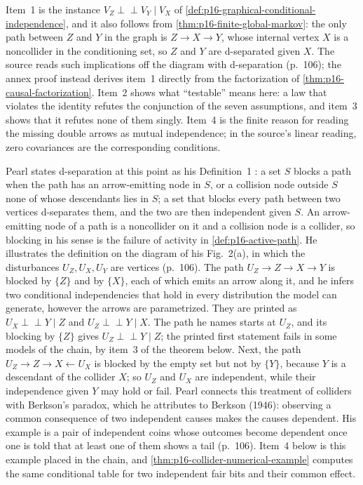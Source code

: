 Item~1 is the instance \(V_Z\mathrel{\perp\!\!\!\perp}V_Y\mid V_X\) of
\cref{def:p16-graphical-conditional-independence}, and it also follows
from \cref{thm:p16-finite-global-markov}: the only path between \(Z\)
and \(Y\) in the graph is \(Z\to X\to Y\), whose internal vertex \(X\)
is a noncollider in the conditioning set, so \(Z\) and \(Y\) are
d-separated given \(X\). The source reads such implications off the
diagram with d-separation (p.~106); the annex proof instead derives
item~1 directly from the factorization of
\cref{thm:p16-causal-factorization}. Item~2 shows what ``testable''
means here: a law that violates the identity refutes the conjunction of
the seven assumptions, and item~3 shows that it refutes none of them
singly. Item~4 is the finite reason for reading the missing double arrows
as mutual independence; in the source's linear reading, zero covariances
are the corresponding conditions.

Pearl states d-separation at this point as his Definition~1
\cite[sec.~3.1, p.~106]{Pearl2009CausalOverview}: a set \(S\) blocks a
path when the path has an arrow-emitting node in \(S\), or a collision
node outside \(S\) none of whose descendants lies in \(S\); a set that
blocks every path between two vertices d-separates them, and the two are
then independent given \(S\). An arrow-emitting node of a path is a
noncollider on it and a collision node is a collider, so blocking in his
sense is the failure of activity in \cref{def:p16-active-path}. He
illustrates the definition on the diagram of his Fig.~2(a), in which the
disturbances \(U_Z,U_X,U_Y\) are vertices (p.~106). The path
\(U_Z\to Z\to X\to Y\) is blocked by \(\{Z\}\) and by \(\{X\}\), each
of which emits an arrow along it, and he infers two conditional
independencies that hold in every distribution the model can generate,
however the arrows are parametrized. They are printed as
\(U_X\mathrel{\perp\!\!\!\perp}Y\mid Z\) and
\(U_Z\mathrel{\perp\!\!\!\perp}Y\mid X\). The path he names starts at
\(U_Z\), and its blocking by \(\{Z\}\) gives
\(U_Z\mathrel{\perp\!\!\!\perp}Y\mid Z\); the printed first statement
fails in some models of the chain, by item~3 of the theorem below. Next,
the path \(U_Z\to Z\to X\leftarrow U_X\) is blocked by the empty set but
not by \(\{Y\}\), because \(Y\) is a descendant of the collider \(X\);
so \(U_Z\) and \(U_X\) are independent, while their independence given
\(Y\) may hold or fail. Pearl connects this treatment of colliders with
Berkson's paradox, which he attributes to Berkson (1946): observing a
common consequence of two independent causes makes the causes dependent.
His example is a pair of independent coins whose outcomes become
dependent once one is told that at least one of them shows a tail
(p.~106). Item~4 below is this example placed in the chain, and
\cref{thm:p16-collider-numerical-example} computes the same conditional
table for two independent fair bits and their common effect.

